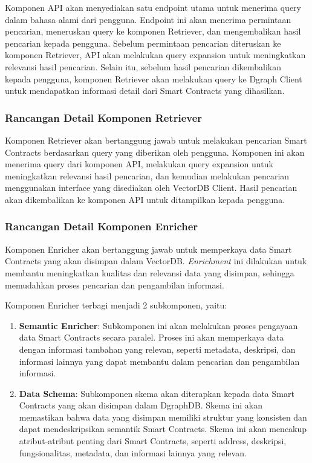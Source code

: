 Komponen API akan menyediakan satu endpoint utama untuk menerima query dalam bahasa alami dari pengguna. Endpoint ini akan menerima permintaan pencarian, meneruskan query ke komponen Retriever, dan mengembalikan hasil pencarian kepada pengguna. Sebelum permintaan pencarian diteruskan ke komponen Retriever, API akan melakukan query expansion untuk meningkatkan relevansi hasil pencarian. Selain itu, sebelum hasil pencarian dikembalikan kepada pengguna, komponen Retriever akan melakukan query ke Dgraph Client untuk mendapatkan informasi detail dari Smart Contracts yang dihasilkan.

\subsubsection{Rancangan Detail Komponen Retriever}

Komponen Retriever akan bertanggung jawab untuk melakukan pencarian Smart Contracts berdasarkan query yang diberikan oleh pengguna. Komponen ini akan menerima query dari komponen API, melakukan query expansion untuk meningkatkan relevansi hasil pencarian, dan kemudian melakukan pencarian menggunakan interface yang disediakan oleh VectorDB Client. Hasil pencarian akan dikembalikan ke komponen API untuk ditampilkan kepada pengguna.

\subsubsection{Rancangan Detail Komponen Enricher}

Komponen Enricher akan bertanggung jawab untuk memperkaya data Smart Contracts yang akan disimpan dalam VectorDB. \textit{Enrichment} ini dilakukan untuk membantu meningkatkan kualitas dan relevansi data yang disimpan, sehingga memudahkan proses pencarian dan pengambilan informasi.

Komponen Enricher terbagi menjadi 2 subkomponen, yaitu:
\begin{enumerate}
    \item \textbf{Semantic Enricher}: Subkomponen ini akan melakukan proses pengayaan data Smart Contracts secara paralel. Proses ini akan memperkaya data dengan informasi tambahan yang relevan, seperti metadata, deskripsi, dan informasi lainnya yang dapat membantu dalam pencarian dan pengambilan informasi.
    \item \textbf{Data Schema}:
    Subkomponen skema akan diterapkan kepada data Smart Contracts yang akan disimpan dalam DgraphDB. Skema ini akan memastikan bahwa data yang disimpan memiliki struktur yang konsisten dan dapat mendeskripsikan semantik Smart Contracts. Skema ini akan mencakup atribut-atribut penting dari Smart Contracts, seperti address, deskripsi, fungsionalitas, metadata, dan informasi lainnya yang relevan.
\end{enumerate}

